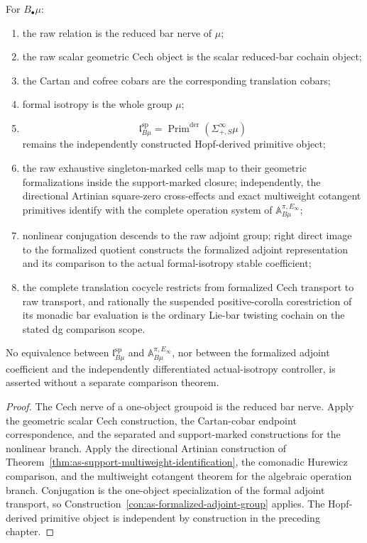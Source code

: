 \begin{theorem}
\label{thm:as-one-object-reduction}
For $B_\bullet\mu$:
\begin{enumerate}
    \item the raw relation is the reduced bar nerve of $\mu$;
    \item the raw scalar geometric Cech object is the scalar reduced-bar
    cochain object;
    \item the Cartan and cofree cobars are the corresponding translation
    cobars;
    \item formal isotropy is the whole group $\mu$;
    \item
    \[
        \mathfrak l_{B\mu}^{\mathrm{sp}}
        =
        \operatorname{Prim}^{\mathrm{der}}
        \left(
            \Sigma^\infty_{+,S}\mu
        \right)
    \]
    remains the independently constructed Hopf-derived primitive object;
    \item the raw exhaustive singleton-marked cells map to their geometric
    formalizations inside the support-marked closure; independently, the
    directional Artinian square-zero cross-effects and exact multiweight
    cotangent primitives identify with the complete operation system of
    $\mathbb A_{B\mu}^{\pi,E_\infty}$;
    \item nonlinear conjugation descends to the raw adjoint group; right
    direct image to the formalized quotient constructs the formalized adjoint
    representation and its comparison to the actual formal-isotropy stable
    coefficient;
    \item the complete translation cocycle restricts from formalized Cech
    transport to raw transport, and rationally the suspended positive-corolla
    corestriction of its monadic bar evaluation is the ordinary Lie-bar
    twisting cochain on the stated dg comparison scope.
\end{enumerate}
No equivalence between
$\mathfrak l_{B\mu}^{\mathrm{sp}}$ and
$\mathbb A_{B\mu}^{\pi,E_\infty}$, nor between the formalized adjoint
coefficient and the independently differentiated actual-isotropy controller,
is asserted without a separate comparison theorem.
\end{theorem}

\begin{proof}
The Cech nerve of a one-object groupoid is the reduced bar nerve.  Apply the
geometric scalar Cech construction, the Cartan-cobar endpoint
correspondence, and the separated and support-marked constructions for the
nonlinear branch.  Apply the directional Artinian construction of
Theorem~\ref{thm:as-support-multiweight-identification}, the comonadic
Hurewicz comparison, and the multiweight cotangent theorem for the algebraic
operation branch.  Conjugation is the one-object specialization of the formal
adjoint transport, so
Construction~\ref{con:as-formalized-adjoint-group} applies.  The
Hopf-derived primitive object is independent by construction in the
preceding chapter.
\end{proof}

